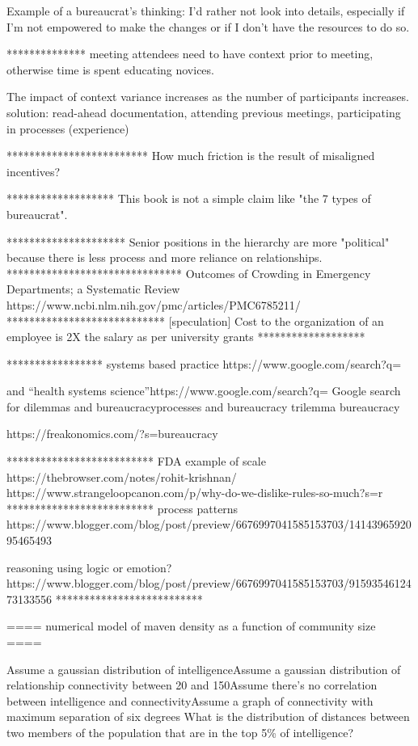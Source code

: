 Example of a bureaucrat's thinking:
I'd rather not look into details, especially if I'm not empowered to make the changes or if I don't have the resources to do so.

**************
meeting attendees need to have context prior to meeting, otherwise time is spent educating novices. 

The impact of context variance increases as the number of participants increases. solution: read-ahead documentation, attending previous meetings, participating in processes (experience)

*************************
How much friction is the result of misaligned incentives?

*******************
This book is not a simple claim like "the 7 types of bureaucrat". 

*********************
Senior positions in the hierarchy are more "political" because there is less process and more reliance on relationships.
*******************************
Outcomes of Crowding in Emergency Departments; a Systematic Review
https://www.ncbi.nlm.nih.gov/pmc/articles/PMC6785211/ 
****************************
[speculation] Cost to the organization of an employee is 2X the salary as per university grants
*******************

*****************
systems based practice 
https://www.google.com/search?q=%

and “health systems science”https://www.google.com/search?q=%
Google search for dilemmas and bureaucracyprocesses and bureaucracy
trilemma bureaucracy

https://freakonomics.com/?s=bureaucracy

**************************
FDA example of scale
https://thebrowser.com/notes/rohit-krishnan/
https://www.strangeloopcanon.com/p/why-do-we-dislike-rules-so-much?s=r
**************************
process patterns
https://www.blogger.com/blog/post/preview/6676997041585153703/1414396592095465493

reasoning using logic or emotion?
https://www.blogger.com/blog/post/preview/6676997041585153703/9159354612473133556
**************************

==== numerical model of maven density as a function of community size ====

Assume a gaussian distribution of intelligenceAssume a gaussian distribution of relationship connectivity between 20 and 150Assume there's no correlation between intelligence and connectivityAssume a graph of connectivity with maximum separation of six degrees
What is the distribution of distances between two members of the population that are in the top 5\% of intelligence?
